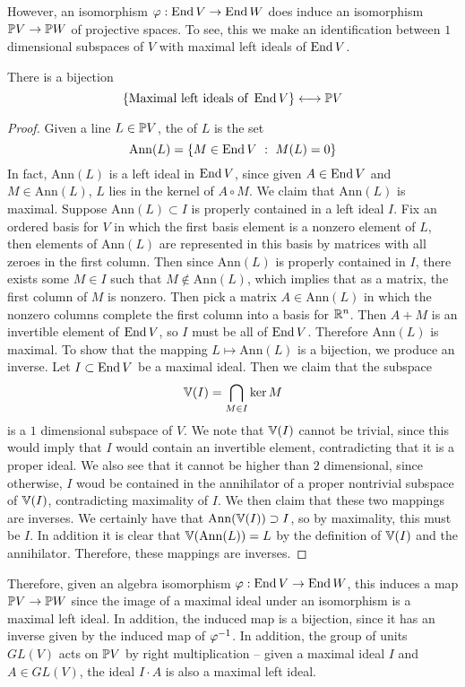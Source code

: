 %
However, an isomorphism $\varphi : \End V \to \End W$ does induce an isomorphism
$\P V \to \P W$ of projective spaces. To see, this we make an identification
between $1$ dimensional subspaces of $V$ with maximal left ideals of $\End V$.
%
\begin{prop}
There is a bijection
\[
\set{\text{Maximal left ideals of } \End V} \longleftrightarrow \P V
\]
\end{prop}
%
\begin{proof}
Given a line $L \in \P V$, the  of $L$ is the set
\[
\mathrm{Ann}(L) = \set{M \in \End V ~:~ M(L) = 0}
\]
In fact, $\mathrm{Ann}(L)$
is a left ideal in $\End V$, since given $A \in \End V$ and $M \in \mathrm{Ann}(L)$,
$L$ lies in the kernel of $A \circ M$. We claim that $\mathrm{Ann}(L)$ is maximal.
Suppose $\mathrm{Ann}(L) \subset I$ is properly contained in a left ideal $I$.
Fix an ordered basis for $V$ in which the first basis element is a
nonzero element of $L$, then elements of $\mathrm{Ann}(L)$ are represented in this basis
by matrices with all zeroes in the first column. Then since $\mathrm{Ann}(L)$ is
properly contained in $I$, there exists some $M \in I$ such that
$M \notin \mathrm{Ann}(L)$, which implies that as a matrix, the first column
of $M$ is nonzero. Then pick a matrix $A \in \mathrm{Ann}(L)$ in which
the nonzero columns complete the first column into a basis for $\R^n$. Then
$A + M$ is an invertible element of $\End V$, so $I$ must be all of $\End V$.
Therefore $\mathrm{Ann}(L)$ is maximal. To show that the mapping
$L \mapsto \mathrm{Ann}(L)$ is a bijection, we produce an inverse. Let
$I \subset \End V$ be a maximal ideal. Then we claim that the subspace
\[
\V(I) = \bigcap_{M \in I}\ker M
\]
is a $1$ dimensional subspace of $V$. We note that $\V(I)$ cannot be trivial,
since this would imply that $I$ would contain an invertible element, contradicting
that it is a proper ideal. We also see that it cannot be higher than $2$ dimensional,
since otherwise, $I$ woud be contained in the annihilator of a proper nontrivial
subspace of $\V(I)$, contradicting maximality of $I$. We then claim that
these two mappings are inverses. We certainly have that
$\mathrm{Ann}(\V(I)) \supset I$, so by maximality, this must be $I$. In addition
it is clear that $\V(\mathrm{Ann}(L)) = L$ by the definition of $\V(I)$ and
the annihilator. Therefore, these mappings are inverses.
\end{proof}
%
Therefore, given an algebra isomorphism $\varphi : \End V \to \End W$, this
induces a map $\P V \to \P W$ since the image of a maximal ideal under an
isomorphism is a maximal left ideal. In addition, the induced map is a bijection,
since it has an inverse given by the induced map of $\varphi\inv$. In
addition, the group of units $GL(V)$ acts on $\P V$ by right multiplication --
given a maximal ideal $I$ and $A \in GL(V)$, the ideal $I \cdot A$ is also
a maximal left ideal. \\

